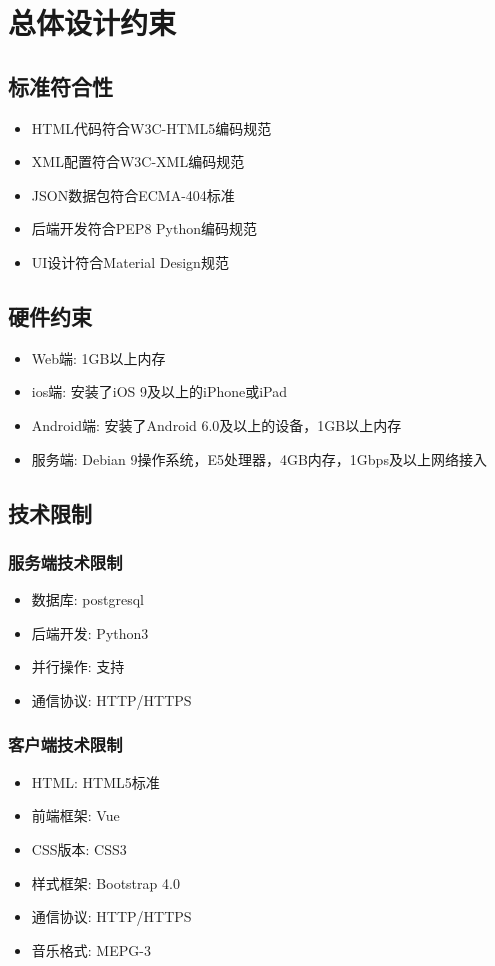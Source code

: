 \chapter{总体设计约束}


\section{标准符合性}


\begin{itemize}
	\item HTML代码符合W3C-HTML5编码规范
	\item XML配置符合W3C-XML编码规范 
	\item JSON数据包符合ECMA-404标准 
	\item 后端开发符合PEP8 Python编码规范 
	\item UI设计符合Material Design规范
\end{itemize}


\section{硬件约束}

\begin{itemize}
	\item Web端: 1GB以上内存
	\item ios端: 安装了iOS 9及以上的iPhone或iPad
	\item Android端: 安装了Android 6.0及以上的设备，1GB以上内存
	\item 服务端: Debian 9操作系统，E5处理器，4GB内存，1Gbps及以上网络接入
\end{itemize}


\section{技术限制}

\subsection{服务端技术限制}

\begin{itemize}
	\item 数据库: postgresql
	\item 后端开发: Python3
	\item 并行操作: 支持
	\item 通信协议: HTTP/HTTPS
\end{itemize}

\subsection{客户端技术限制}

\begin{itemize}
	\item HTML: HTML5标准
	\item 前端框架: Vue
	\item CSS版本: CSS3
	\item 样式框架: Bootstrap 4.0
	\item 通信协议: HTTP/HTTPS
	\item 音乐格式: MEPG-3
\end{itemize}

